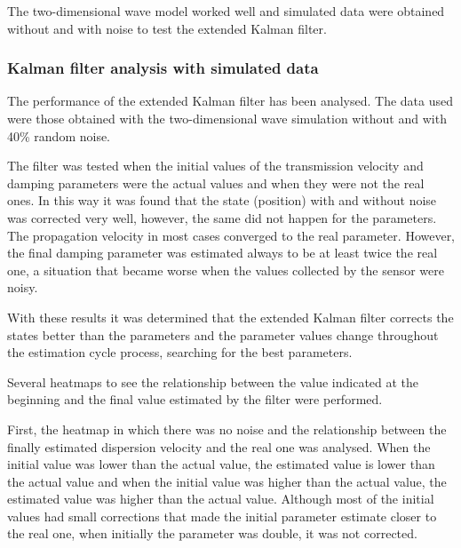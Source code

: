 \documentclass[12pt, a4paper]{article} %
\begin{document}
The two-dimensional wave model worked well and simulated data were obtained without and with noise to test the extended Kalman filter.

\setlength{\parskip}{0mm}

\subsubsection{Kalman filter analysis with simulated data}

The performance of the extended Kalman filter has been analysed. The data used were those obtained with the two-dimensional wave simulation without and with 40\% random noise. 

\setlength{\parskip}{4mm}

The filter was tested when the initial values of the transmission velocity and damping parameters were the actual values and when they were not the real ones. In this way it was found that the state (position) with and without noise was corrected very well, however, the same did not happen for the parameters. The propagation velocity in most cases converged to the real parameter. However, the final damping parameter was estimated always to be at least twice the real one, a situation that became worse when the values collected by the sensor were noisy.

With these results it was determined that the extended Kalman filter corrects the states better than the parameters and the parameter values change throughout the estimation cycle process, searching for the best parameters.

Several heatmaps to see the relationship between the value indicated at the beginning and the final value estimated by the filter were performed. 

First, the heatmap in which there was no noise and the relationship between the finally estimated dispersion velocity and the real one was analysed. When the initial value was lower than the actual value, the estimated value is lower than the actual value and when the initial value was higher than the actual value, the estimated value was higher than the actual value. Although most of the initial values had small corrections that made the initial parameter estimate closer to the real one, when initially the parameter was double, it was not corrected. 
\end{document}

